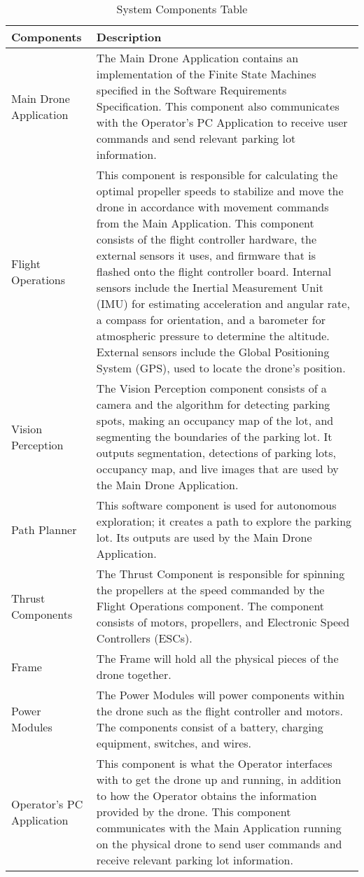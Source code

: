 \documentclass{article}
\begin{document}
\begin{table}[!h]
\begin{center}
\caption {System Components Table} 
\label{tab:SystemComp}
\begin{tabular}{ | m{4 cm} | m{12 cm} | } 
\hline
Components & Description \\
\hline
Main Drone Application & The Main Drone Application contains an implementation of the Finite State Machines specified in the Software Requirements Specification. This component also communicates with the Operator's PC Application to receive user commands and send relevant parking lot information.\\
\hline
Flight Operations & This component is responsible for calculating the optimal propeller speeds to stabilize and move the drone in accordance with movement commands from the Main Application. This component consists of the flight controller hardware, the external sensors it uses, and firmware that is flashed onto the flight controller board. Internal sensors include the Inertial Measurement Unit (IMU) for estimating acceleration and angular rate, a compass for orientation, and a barometer for atmospheric pressure to determine the altitude. External sensors include the Global Positioning System (GPS), used to locate the drone's position. \\
\hline
Vision Perception & The Vision Perception component consists of a camera and the algorithm for detecting parking spots, making an occupancy map of the lot, and segmenting the boundaries of the parking lot. It outputs segmentation, detections of parking lots, occupancy map, and live images that are used by the Main Drone Application. \\
\hline
Path Planner & This software component is used for autonomous exploration; it creates a path to explore the parking lot. Its outputs are used by the Main Drone Application. \\
\hline
Thrust Components & The Thrust Component is responsible for spinning the propellers at the speed commanded by the Flight Operations component. The component consists of motors, propellers, and Electronic Speed Controllers (ESCs).\\
\hline
Frame & The Frame will hold all the physical pieces of the drone together.\\
\hline
Power Modules & The Power Modules will power components within the drone such as the flight controller and motors. The components consist of a battery, charging equipment, switches, and wires.\\
\hline
Operator's PC Application & This component is what the Operator interfaces with to get the drone up and running, in addition to how the Operator obtains the information provided by the drone. This component communicates with the Main Application running on the physical drone to send user commands and receive relevant parking lot information. \\
\hline

\end{tabular}
\end{center}
\end{table}
\end{document}
